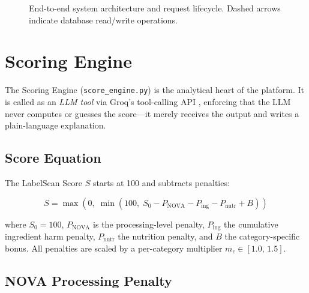 \documentclass[conference]{IEEEtran}
\begin{document}
\begin{figure}[ht]
\caption{End-to-end system architecture and request lifecycle. Dashed arrows indicate database read/write operations.}
\label{fig:arch}
\end{figure}

\section{Scoring Engine}

The Scoring Engine (\texttt{score\_engine.py}) is the analytical heart of the platform.
It is called as an \textit{LLM tool} via Groq's tool-calling API
\cite{groq_tool_calling}, enforcing that the LLM never computes or guesses
the score---it merely receives the output and writes a plain-language explanation.

\subsection{Score Equation}

The LabelScan Score $S$ starts at 100 and subtracts penalties:

\begin{equation}
S = \max\!\left(0,\; \min\!\left(100,\; S_0 - P_{\text{NOVA}} - P_{\text{ing}} - P_{\text{nutr}} + B\right)\right)
\label{eq:score}
\end{equation}

where $S_0 = 100$, $P_{\text{NOVA}}$ is the processing-level penalty,
$P_{\text{ing}}$ the cumulative ingredient harm penalty,
$P_{\text{nutr}}$ the nutrition penalty, and $B$ the category-specific bonus.
All penalties are scaled by a per-category multiplier $m_c \in [1.0,\, 1.5]$.

\subsection{NOVA Processing Penalty}
\end{document}
